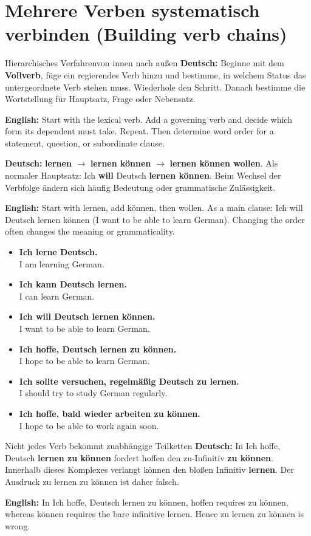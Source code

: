 \documentclass[a4paper,11pt]{article}
\newcommand{\GermanText}[1]{\textbf{Deutsch: }#1\par}
\newcommand{\EnglishText}[1]{{\small\color{SoftGray}\textbf{English: }#1\par}}
\newcommand{\ExampleItem}[2]{\item \textbf{#1}\\{\small\color{SoftGray}#2}}
\newcommand{\DEEN}[2]{\GermanText{#1}\EnglishText{#2}}
\newcommand{\Pair}[2]{\ExampleItem{#1}{#2}}
\begin{document}
\section{Mehrere Verben systematisch verbinden \textnormal{(Building verb chains)}}
\begin{grammarentry}{Hierarchisches Verfahren}{von innen nach außen}
\DEEN{Beginne mit dem \textbf{Vollverb}, füge ein regierendes Verb hinzu und bestimme, in welchem Status das untergeordnete Verb stehen muss. Wiederhole den Schritt. Danach bestimme die Wortstellung für Hauptsatz, Frage oder Nebensatz.}{Start with the lexical verb. Add a governing verb and decide which form its dependent must take. Repeat. Then determine word order for a statement, question, or subordinate clause.}
\DEEN{\textbf{lernen} $\rightarrow$ \textbf{lernen können} $\rightarrow$ \textbf{lernen können wollen}. Als normaler Hauptsatz: \glqq Ich \textbf{will} Deutsch \textbf{lernen können}.\grqq{} Beim Wechsel der Verbfolge ändern sich häufig Bedeutung oder grammatische Zulässigkeit.}{Start with lernen, add können, then wollen. As a main clause: Ich will Deutsch lernen können (I want to be able to learn German). Changing the order often changes the meaning or grammaticality.}
\end{grammarentry}
\begin{exbox}\begin{itemize}
\Pair{Ich lerne Deutsch.}{I am learning German.}
\Pair{Ich kann Deutsch lernen.}{I can learn German.}
\Pair{Ich will Deutsch lernen können.}{I want to be able to learn German.}
\Pair{Ich hoffe, Deutsch lernen zu können.}{I hope to be able to learn German.}
\Pair{Ich sollte versuchen, regelmäßig Deutsch zu lernen.}{I should try to study German regularly.}
\Pair{Ich hoffe, bald wieder arbeiten zu können.}{I hope to be able to work again soon.}
\end{itemize}\end{exbox}
\begin{grammarentry}{Nicht jedes Verb bekommt zu}{abhängige Teilketten}
\DEEN{In \glqq Ich hoffe, Deutsch \textbf{lernen zu können}\grqq{} fordert hoffen den zu-Infinitiv \textbf{zu können}. Innerhalb dieses Komplexes verlangt können den bloßen Infinitiv \textbf{lernen}. Der Ausdruck \glqq zu lernen zu können\grqq{} ist daher falsch.}{In Ich hoffe, Deutsch lernen zu können, hoffen requires zu können, whereas können requires the bare infinitive lernen. Hence zu lernen zu können is wrong.}
\end{grammarentry}
\end{document}
